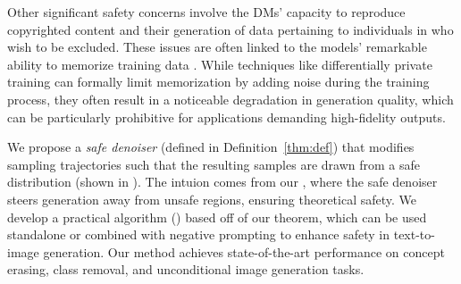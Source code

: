 Other significant safety concerns involve the DMs' capacity to reproduce copyrighted content and their generation of data pertaining to individuals in  who wish to be excluded. These issues are often linked to the models' remarkable ability to memorize training data \cite{carlini2023extracting}. While techniques like differentially private training \cite{dockhorn2023differentially, liu2024differentially} can formally limit memorization by adding noise during the training process, they often result in a noticeable degradation in generation quality, which can be particularly prohibitive for applications demanding high-fidelity outputs.

We propose a \textit{safe denoiser} (defined in Definition~\ref{thm:def}) that modifies sampling trajectories such that the resulting samples are drawn from a safe distribution 
(shown in ). The intuion comes from our , 
where the safe denoiser steers generation away from unsafe regions, ensuring theoretical safety. We develop a practical algorithm () based off of our theorem, which can be used standalone or combined with negative prompting to enhance safety in text-to-image generation. 
Our method achieves state-of-the-art performance on concept erasing, class removal, and unconditional image generation tasks.